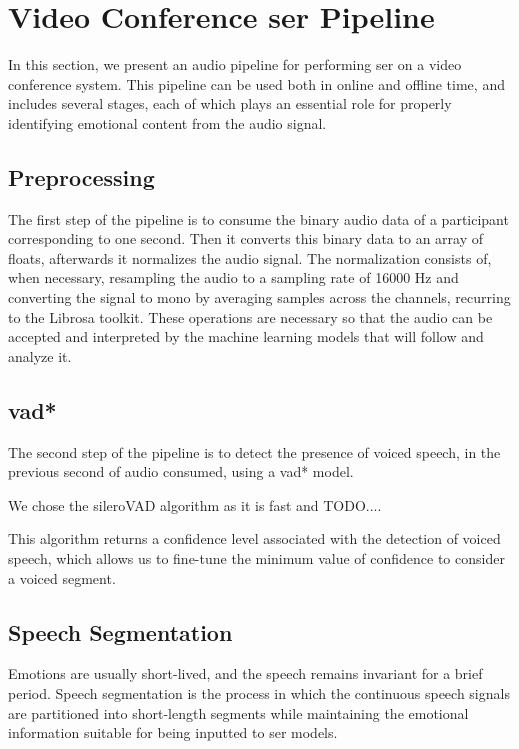\chapter{Video Conference \acl{ser} Pipeline}
\label{chapter:ser_conf}

In this section, we present an audio pipeline for performing \ac{ser} on a video conference system. This pipeline can be used both in online and offline time, and includes several stages, each of which plays an essential role for properly identifying emotional content from the audio signal.

\section{Preprocessing}

The first step of the pipeline is to consume the binary audio data of a participant corresponding to one second. Then it converts this binary data to an array of floats, afterwards it normalizes the audio signal. The normalization consists of, when necessary, resampling the audio to a sampling rate of 16000 Hz and converting the signal to mono by averaging samples across the channels, recurring to the Librosa toolkit. These operations are necessary so that the audio can be accepted and interpreted by the machine learning models that will follow and analyze it.

\section{\acl{vad*}}

The second step of the pipeline is to detect the presence of voiced speech, in the previous second of audio consumed, using a \ac{vad*} model.

We chose the sileroVAD algorithm as it is fast and TODO....

This algorithm returns a confidence level associated with the detection of voiced speech, which allows us to fine-tune the minimum value of confidence to consider a voiced segment.

\section{Speech Segmentation}


Emotions are usually short-lived, and the speech remains invariant for a brief period. Speech segmentation is the process in which the continuous speech signals are partitioned into short-length segments while maintaining the emotional information suitable for being inputted to \ac{ser} models.

